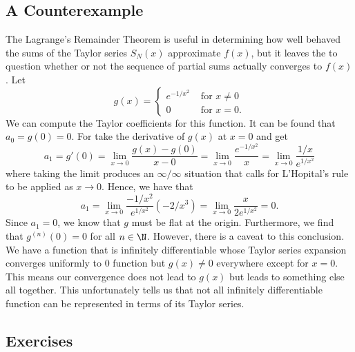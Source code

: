 \subsection{A Counterexample}

The Lagrange's Remainder Theorem is useful in determining how well behaved the sums of the Taylor series \( S_N(x) \) approximate \( f(x) \), but it leaves the to question whether or not the sequence of partial sums actually converges to \( f(x) \). Let 
\[  g(x) = 
\begin{cases}
    e^{-1/x^2} &\text{ for } x \neq 0  \\
    0 &\text{ for } x = 0. 
\end{cases} \]
We can compute the Taylor coefficients for this function. It can be found that \( a_{0 }= g(0) = 0  \). For take the derivative of \( g(x)  \) at \( x = 0  \)  and get 
\[  a_1 = g'(0) = \lim_{ x \to 0 }  \frac{ g(x) - g(0)  }{ x - 0  } = \lim_{ x \to 0 }  \frac{ e^{-1/x^2} }{ x  } = \lim_{ x \to 0 }  \frac{ 1 /x  }{ e^{1/x^2} }   \] where taking the limit produces an \( \infty / \infty \) situation that calls for L'Hopital's rule to be applied as \( x \to 0  \). Hence, we have that 
\[  a_{1} = \lim_{ x \to 0 }  \frac{ -1/x^2  }{  e^{1/x^2} } (-2/x^3) = \lim_{ x \to 0  } \frac{ x }{ 2 e^{1/x^2} } = 0.\]
Since \( a_1 = 0  \), we know that \( g  \) must be flat at the origin. Furthermore, we find that \( g^{(n)}(0) = 0  \) for all \( n \in \N  \).
However, there is a caveat to this conclusion. We have a function that is infinitely differentiable whose Taylor series expansion converges uniformly to \( 0  \) function but \( g(x) \neq 0  \) everywhere except for \( x = 0  \). This means our convergence does not lead to \( g(x)  \) but leads to something else all together. This unfortunately tells us that not all infinitely differentiable function can be represented in terms of its Taylor series.

\subsection{Exercises}





